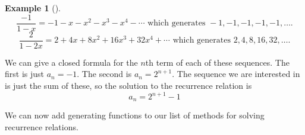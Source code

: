 \documentclass[10pt,]{book}
\theoremstyle{plain}
\theoremstyle{definition}
\theoremstyle{definition}
\newtheorem{example}[theorem]{Example}
\theoremstyle{definition}
\theoremstyle{definition}
\numberwithin{equation}{chapter}
\begin{document}
\begin{example}[]
\begin{equation*}
\frac{-1}{1-x} = -1 - x - x^2 -x^3 - x^4 - \cdots \mbox{ which generates }  -1, -1, -1, -1, -1, \ldots.
\end{equation*}
%
\begin{equation*}
\frac{2}{1-2x} = 2 + 4x + 8x^2 + 16x^3 + 32x^4 + \cdots \mbox{ which generates }  2, 4, 8, 16, 32, \ldots.
\end{equation*}
%
\par
\hypertarget{p-1115}{}%
We can give a closed formula for the \(n\)th term of each of these sequences. The first is just \(a_n = -1\). The second is \(a_n = 2^{n+1}\). The sequence we are interested in is just the sum of these, so the solution to the recurrence relation is%
\begin{equation*}
a_n = 2^{n+1} - 1
\end{equation*}
%
\end{example}
\hypertarget{p-1116}{}%
We can now add generating functions to our list of methods for solving recurrence relations.%
\typeout{************************************************}
\typeout{************************************************}
\end{document}
